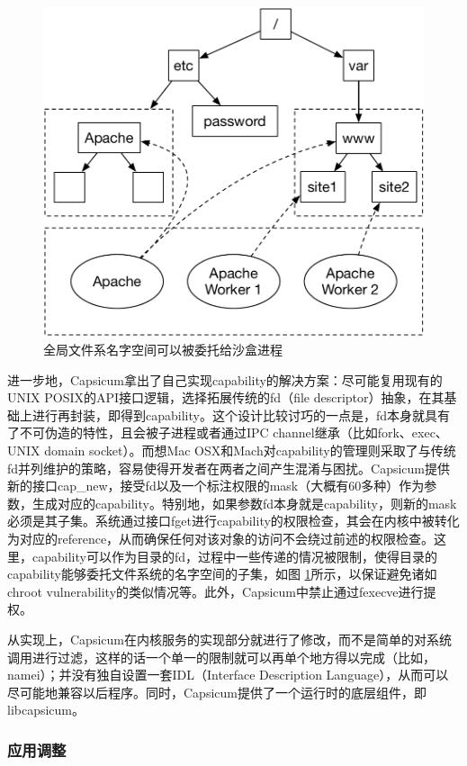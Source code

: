 \documentclass[final,5p,times]{elsarticle}
\begin{document}
\begin{figure}
\centering
\includegraphics[width=0.65\linewidth]{imgs/fs-namespace-subsets}
\caption{全局文件系名字空间可以被委托给沙盒进程}
\label{fig:fd-namespace-subsets}
\end{figure}

进一步地，Capsicum拿出了自己实现capability的解决方案：尽可能复用现有的UNIX POSIX的API接口逻辑，选择拓展传统的fd（file descriptor）抽象，在其基础上进行再封装，即得到capability。这个设计比较讨巧的一点是，fd本身就具有了不可伪造的特性，且会被子进程或者通过IPC channel继承（比如fork、exec、UNIX domain socket）。而想Mac OSX和Mach对capability的管理则采取了与传统fd并列维护的策略，容易使得开发者在两者之间产生混淆与困扰。Capsicum提供新的接口cap\_new，接受fd以及一个标注权限的mask（大概有60多种）作为参数，生成对应的capability。特别地，如果参数fd本身就是capability，则新的mask必须是其子集。系统通过接口fget进行capability的权限检查，其会在内核中被转化为对应的reference，从而确保任何对该对象的访问不会绕过前述的权限检查。这里，capability可以作为目录的fd，过程中一些传递的情况被限制，使得目录的capability能够委托文件系统的名字空间的子集，如图 \ref{fig:fd-namespace-subsets}所示，以保证避免诸如chroot vulnerability的类似情况等。此外，Capsicum中禁止通过fexecve进行提权。

从实现上，Capsicum在内核服务的实现部分就进行了修改，而不是简单的对系统调用进行过滤，这样的话一个单一的限制就可以再单个地方得以完成（比如，namei）；并没有独自设置一套IDL（Interface Description Language），从而可以尽可能地兼容以后程序。同时，Capsicum提供了一个运行时的底层组件，即libcapsicum。

\subsubsection{应用调整}
\label{sss:adoption}
\end{document}
